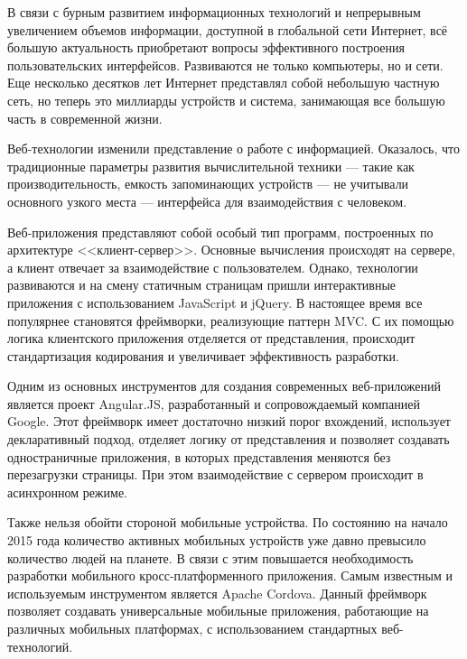 В связи с бурным развитием информационных технологий и непрерывным увеличением объемов информации, доступной в глобальной сети Интернет, всё большую актуальность приобретают вопросы эффективного построения пользовательских интерфейсов. Развиваются не только компьютеры, но и сети. Еще несколько десятков лет Интернет представлял собой небольшую частную сеть, но теперь это миллиарды устройств и система, занимающая все большую часть в современной жизни.

Веб-технологии изменили представление о работе с информацией. Оказалось, что традиционные параметры развития вычислительной техники --- такие как производительность, емкость запоминающих устройств --- не учитывали основного узкого места --- интерфейса для взаимодействия с человеком.

Веб-приложения представляют собой особый тип программ, построенных по архитектуре <<клиент-сервер>>. Основные вычисления происходят на сервере, а клиент отвечает за взаимодействие с пользователем. Однако, технологии развиваются и на смену статичным страницам пришли интерактивные приложения с использованием JavaScript и jQuery. В настоящее время все популярнее становятся фреймворки, реализующие паттерн MVC. С их помощью логика клиентского приложения отделяется от представления, происходит стандартизация кодирования и увеличивает эффективность разработки.

Одним из основных инструментов для создания современных веб-приложений является проект Angular.JS, разработанный и сопровождаемый компанией Google. Этот фреймворк имеет достаточно низкий порог вхождений, использует декларативный подход, отделяет логику от представления и позволяет создавать одностраничные приложения, в которых представления меняются без перезагрузки страницы. При этом взаимодействие с сервером происходит в асинхронном режиме.

Также нельзя обойти стороной мобильные устройства. По состоянию на начало 2015 года количество активных мобильных устройств уже давно превысило количество людей на планете\cite{mobile_count}. В связи с этим повышается необходимость разработки мобильного кросс-платформенного приложения. Самым известным и используемым инструментом является Apache Cordova\cite{cordova}. Данный фреймворк позволяет создавать универсальные мобильные приложения, работающие на различных мобильных платформах, с использованием стандартных веб-технологий.

